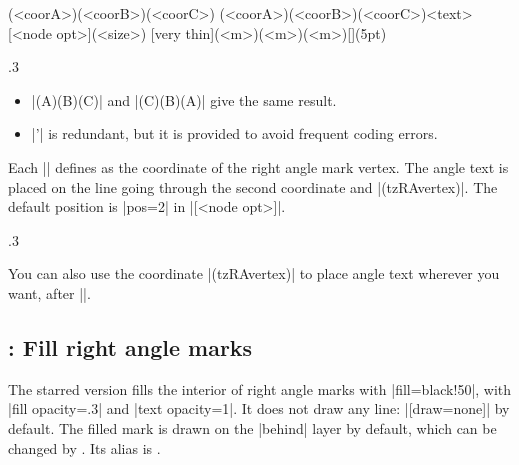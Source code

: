 \begin{tzdef}{}
\tzrightanglemark(<coorA>)(<coorB>)(<coorC>)
\tzrightanglemark[<opt>](<coorA>)(<coorB>)(<coorC>){<text>}[<node opt>](<size>)
 [very thin](<m>)(<m>)(<m>){}[](5pt)
\end{tzdef}

\begin{tzcode}{.3}
\end{tzcode}

\remark 
\begin{itemize}\firmlist
\item |\tzrightanglemark(A)(B)(C)| and |\tzrightanglemark(C)(B)(A)| give the same result.
\item |\tzrightanglemark'| is redundant, but it is provided to avoid frequent coding errors.
\end{itemize} 

Each |\tzrightanglemark| defines  as the coordinate of the right angle mark vertex.
The angle text is placed on the line going through the second coordinate and |(tzRAvertex)|. The default position is |pos=2| in |[<node opt>]|.

\begin{tzcode}{.3}
{}
\end{tzcode}

\remark You can also use the coordinate |(tzRAvertex)| to place angle text wherever you want, after |\tzrightanglemark|.




\subsection{\protect\cmd{\tzrightanglemark*}: Fill right angle marks}
\label{ss:tzrightangle*}

The starred version \icmd{\tzrightanglemark*} fills the interior of right angle marks with |fill=black!50|, with |fill opacity=.3| and |text opacity=1|. It does not draw any line: |[draw=none]| by default. The filled mark is drawn on the |behind| layer by default, which can be changed by \icmd{\settzanglelayer}.
Its alias is \icmd{\settzanglemarklayer}.

